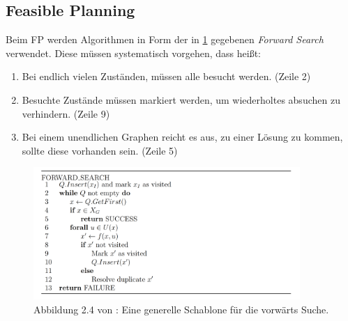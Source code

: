 

%

\subsection {Feasible Planning} %
Beim FP werden Algorithmen in Form der in \ref{lav04} gegebenen \textit{Forward Search} verwendet. Diese müssen systematisch vorgehen, dass heißt:
\begin{enumerate}
	\item Bei endlich vielen Zuständen, müssen alle besucht werden. (Zeile 2)
	\item Besuchte Zustände müssen markiert werden, um wiederholtes absuchen zu verhindern. (Zeile 9)
	\item Bei einem unendlichen Graphen reicht es aus, zu einer Lösung zu kommen, sollte diese vorhanden sein. (Zeile 5)
\end{enumerate} \cite[~S. 32]{Lav06}
\begin{figure}
	\centering
	\includegraphics[width=0.9\textwidth]{images/img225.png}
	\caption{Abbildung 2.4 von \cite[~S. 33]{Lav06}:  Eine generelle Schablone für die vorwärts Suche.}
	\label{lav04}
\end{figure} 


